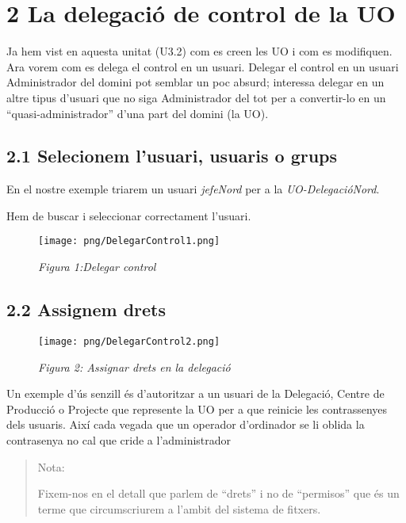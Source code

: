 \documentclass[
  a4paper,
]{article}
\begin{document}
\section{2 La delegació de control de la
UO}\label{la-delegaciuxf3-de-control-de-la-uo}

Ja hem vist en aquesta unitat (U3.2) com es creen les UO i com es
modifiquen. Ara vorem com es delega el control en un usuari. Delegar el
control en un usuari Administrador del domini pot semblar un poc absurd;
interessa delegar en un altre tipus d'usuari que no siga Administrador
del tot per a convertir-lo en un ``quasi-administrador'' d'una part del
domini (la UO).

\subsection{2.1 Selecionem l'usuari, usuaris o
grups}\label{selecionem-lusuari-usuaris-o-grups}

En el nostre exemple triarem un usuari \emph{jefeNord} per a la
\emph{UO-DelegacióNord}.

Hem de buscar i seleccionar correctament l'usuari.

\begin{figure}
\centering
\texttt{[image: png/DelegarControl1.png]}
\caption{\emph{Figura 1:Delegar control}}
\end{figure}

\subsection{2.2 Assignem drets}\label{assignem-drets}

\begin{figure}
\centering
\texttt{[image: png/DelegarControl2.png]}
\caption{\emph{Figura 2: Assignar drets en la delegació}}
\end{figure}

Un exemple d'ús senzill és d'autoritzar a un usuari de la Delegació,
Centre de Producció o Projecte que represente la UO per a que reinicie
les contrassenyes dels usuaris. Així cada vegada que un operador
d'ordinador se li oblida la contrasenya no cal que cride a
l'administrador

\begin{quote}
Nota:

Fixem-nos en el detall que parlem de ``drets'' i no de ``permisos'' que
és un terme que circumscriurem a l'ambit del sistema de fitxers.
\end{quote}
\end{document}
